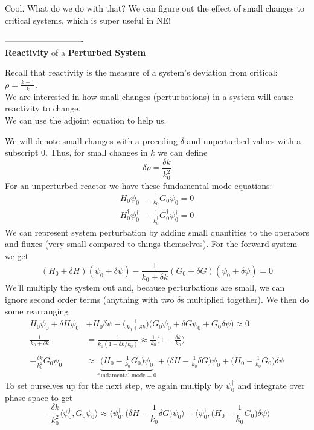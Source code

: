 \documentclass[12pt]{article}
\begin{document}
Cool. What do we do with that? We can figure out the effect of small changes to critical systems, which is super useful in NE!

----------------------------\\
\textbf{Reactivity} of a \textbf{Perturbed System}

Recall that reactivity is the measure of a system's deviation from critical: $\rho = \frac{k-1}{k}$.\\
We are interested in how small changes (perturbations) in a system will cause reactivity to change.\\
We can use the adjoint equation to help us.

We will denote small changes with a preceding $\delta$ and unperturbed values with a subscript $0$. Thus, for small changes in $k$ we can define 
\[
\delta \rho = \frac{\delta k}{k_0^2}
\]
For an unperturbed reactor we have these fundamental mode equations:
\begin{align*}
H_0\psi_0 &- \frac{1}{k_0}G_0\psi_0 = 0\\
H_0^{\dagger}\psi_0^{\dagger} &- \frac{1}{k_0^{\dagger}}G_0^{\dagger}\psi_0^{\dagger} = 0
\end{align*}
We can represent system perturbation by adding small quantities to the operators and fluxes (very small compared to things themselves). For the forward system we get
\[
(H_0 + \delta H)(\psi_0 + \delta \psi) - \frac{1}{k_0 + \delta k}(G_0 + \delta G)(\psi_0 + \delta \psi) = 0
\]
We'll multiply the system out and, because perturbations are small, we can ignore second order terms (anything with two $\delta$s multiplied together). We then do some rearranging
\begin{align*}
H_0 \psi_0 + \delta H \psi_0 &+ H_0\delta\psi - \bigl(\frac{1}{k_0 + \delta k}\bigr)\bigl(G_0\psi_0 + \delta G \psi_0 + G_0\delta\psi \bigr) \approx 0 \\
%
\frac{1}{k_0 + \delta k} &= \frac{1}{k_0(1 + \delta k/k_0)} \approx \frac{1}{k_0}\bigl(1 - \frac{\delta k}{k_0}\bigr) \\
\\
%
-\frac{\delta k}{k_0^2}G_0\psi_0 &\approx \underbrace{\bigl(H_0 - \frac{1}{k_0}G_0 \bigr)\psi_0}_{\text{fundamental mode}=0} + \bigl(\delta H - \frac{1}{k_0}\delta G\bigr)\psi_0  + \bigl(H_0 - \frac{1}{k_0}G_0 \bigr)\delta \psi
\end{align*}
To set ourselves up for the next step, we again multiply by $\psi_0^{\dagger}$ and integrate over phase space to get
\begin{equation}
-\frac{\delta k}{k_0^2} \langle \psi_0^{\dagger}, G_0\psi_0 \rangle \approx \langle \psi_0^{\dagger},\bigl(\delta H - \frac{1}{k_0}\delta G\bigr)\psi_0 \rangle + \langle \psi_0^{\dagger},\bigl(H_0 - \frac{1}{k_0}G_0 \bigr)\delta \psi \rangle
\label{eq:perturb}
\end{equation}
\end{document}
